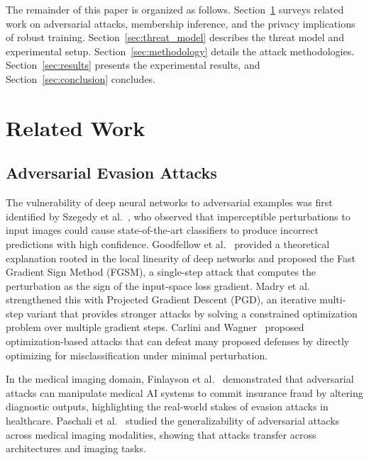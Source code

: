 \documentclass[conference]{IEEEtran}
\begin{document}
The remainder of this paper is organized as follows. Section~\ref{sec:related_work} surveys related work on adversarial attacks, membership inference, and the privacy implications of robust training. Section~\ref{sec:threat_model} describes the threat model and experimental setup. Section~\ref{sec:methodology} details the attack methodologies. Section~\ref{sec:results} presents the experimental results, and Section~\ref{sec:conclusion} concludes.



\section{Related Work}
\label{sec:related_work}

\subsection{Adversarial Evasion Attacks}

The vulnerability of deep neural networks to adversarial examples was first identified by Szegedy et al.~\cite{szegedy2014intriguing}, who observed that imperceptible perturbations to input images could cause state-of-the-art classifiers to produce incorrect predictions with high confidence. Goodfellow et al.~\cite{goodfellow2015explaining} provided a theoretical explanation rooted in the local linearity of deep networks and proposed the Fast Gradient Sign Method (FGSM), a single-step attack that computes the perturbation as the sign of the input-space loss gradient. Madry et al.~\cite{madry2018towards} strengthened this with Projected Gradient Descent (PGD), an iterative multi-step variant that provides stronger attacks by solving a constrained optimization problem over multiple gradient steps. Carlini and Wagner~\cite{carlini2017towards} proposed optimization-based attacks that can defeat many proposed defenses by directly optimizing for misclassification under minimal perturbation.

In the medical imaging domain, Finlayson et al.~\cite{finlayson2019adversarial} demonstrated that adversarial attacks can manipulate medical AI systems to commit insurance fraud by altering diagnostic outputs, highlighting the real-world stakes of evasion attacks in healthcare. Paschali et al.~\cite{paschali2018generalizability} studied the generalizability of adversarial attacks across medical imaging modalities, showing that attacks transfer across architectures and imaging tasks.
\end{document}
